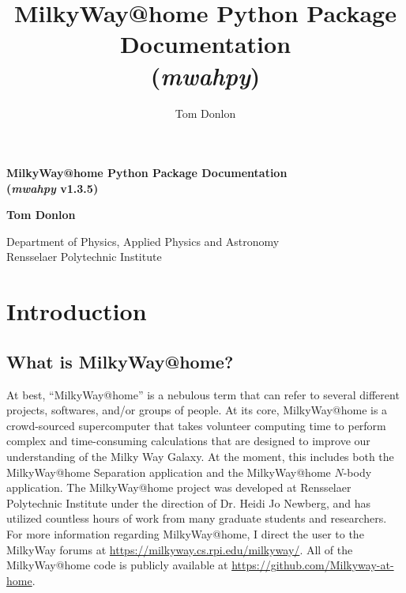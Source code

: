 \documentclass{article}
\author{Tom Donlon}
\title{MilkyWay@home Python Package Documentation \\ (\textit{mwahpy})}
\date{}
\begin{document}
\newcommand{\mwahpy}[0]{\textit{mwahpy }}
\newcommand{\msol}{$M_\odot$}

\begin{titlepage}
   \begin{center}
       \vspace*{5cm}

       \huge\textbf{MilkyWay@home Python Package Documentation \\ (\textit{mwahpy} v1.3.5)}

       \vspace{0.5cm}
        
            
       \vspace{1.5cm}

       \large\textbf{Tom Donlon}
            
       \vspace{0.8cm}
            
       Department of Physics, Applied Physics and Astronomy\\
       Rensselaer Polytechnic Institute
            
   \end{center}
\end{titlepage}

\newpage

\tableofcontents

\newpage

\section{Introduction}

\subsection{What is MilkyWay@home?}

At best, ``MilkyWay@home'' is a nebulous term that can refer to several different projects, softwares, and/or groups of people. At its core, MilkyWay@home is a crowd-sourced supercomputer that takes volunteer computing time to perform complex and time-consuming calculations that are designed to improve our understanding of the Milky Way Galaxy. At the moment, this includes both the MilkyWay@home Separation application and the MilkyWay@home $N$-body application. The MilkyWay@home project was developed at Rensselaer Polytechnic Institute under the direction of Dr. Heidi Jo Newberg, and has utilized countless hours of work from many graduate students and researchers. For more information regarding MilkyWay@home, I direct the user to the MilkyWay forums at \url{https://milkyway.cs.rpi.edu/milkyway/}. All of the MilkyWay@home code is publicly available at \url{https://github.com/Milkyway-at-home}. 
\end{document}

